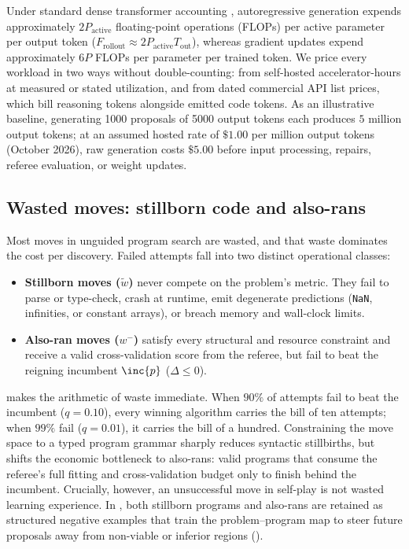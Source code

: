 Under standard dense transformer accounting \citep{kaplan2020scaling,hoffmann2022chinchilla}, autoregressive generation expends approximately $2 P_{\text{active}}$ floating-point operations (FLOPs) per active parameter per output token ($F_{\text{rollout}} \approx 2 P_{\text{active}} T_{\text{out}}$), whereas gradient updates expend approximately $6 P$ FLOPs per parameter per trained token. We price every workload in two ways without double-counting: from self-hosted accelerator-hours at measured or stated utilization, and from dated commercial API list prices, which bill reasoning tokens alongside emitted code tokens. As an illustrative baseline, generating \num{1000} proposals of \num{5000} output tokens each produces $5\text{ million}$ output tokens; at an assumed hosted rate of $\$1.00$ per million output tokens (October 2026), raw generation costs $\$5.00$ before input processing, repairs, referee evaluation, or weight updates.

\subsection{Wasted moves: stillborn code and also-rans}\label{sub:price-waste}\label{subsec:stillborn-alsoran}

Most moves in unguided program search are wasted, and that waste dominates the cost per discovery. Failed attempts fall into two distinct operational classes:
\begin{itemize}
  \item \textbf{Stillborn moves ($\tilde{w}$)} never compete on the problem's metric. They fail to parse or type-check, crash at runtime, emit degenerate predictions (\texttt{NaN}, infinities, or constant arrays), or breach memory and wall-clock limits.
  \item \textbf{Also-ran moves ($w^-$)} satisfy every structural and resource constraint and receive a valid cross-validation score from the referee, but fail to beat the reigning incumbent $\inc{p}$ ($\Delta \le 0$).
\end{itemize}

 makes the arithmetic of waste immediate. When $90\%$ of attempts fail to beat the incumbent ($q = 0.10$), every winning algorithm carries the bill of ten attempts; when $99\%$ fail ($q = 0.01$), it carries the bill of a hundred. Constraining the move space to a typed program grammar \citep{koza1992genetic,kusner2017grammar} sharply reduces syntactic stillbirths, but shifts the economic bottleneck to also-rans: valid programs that consume the referee's full fitting and cross-validation budget only to finish behind the incumbent. Crucially, however, an unsuccessful move in self-play is not wasted learning experience. In \EZ{}, both stillborn programs and also-rans are retained as structured negative examples that train the problem--program map to steer future proposals away from non-viable or inferior regions ().


